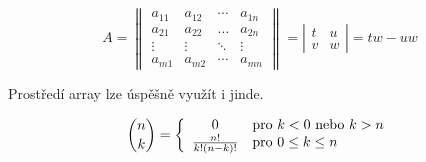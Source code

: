 \documentclass[11pt, a4paper, twocolumn]{article}
\theoremstyle{definition}
\begin{document}
$$
A =
\left\|
\begin{array}{cccc}
a_{11} & a_{12} & \cdots & a_{1n} \\
a_{21} & a_{22} & \ldots & a_{2n} \\
\vdots & \vdots & \ddots & \vdots \\
a_{m1} & a_{m2} & \cdots & a_{mn}
\end{array}
\right\|
=
\left| 
\begin{array}{cc}
t & u \\
v & w
\end{array} \right|
= tw - uw
$$

Prostředí {\selectfont array} lze úspěšně využít i jinde.

$$ \binom{n}{k} = \left\{
\begin{array}{c l}
0 & \text{pro } k < 0 \text{ nebo } k > n \\
\frac{n!}{k!(n-k)!} & \text{pro } 0 \leq k \leq n
\end{array} \right. $$
\end{document}
